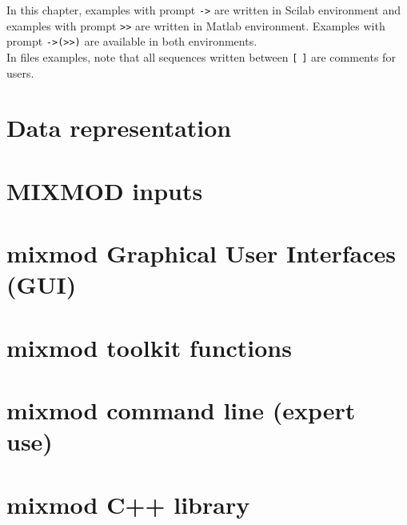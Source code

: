 In this chapter, examples with prompt \verb#-># are written in Scilab environment and examples
with prompt \verb#>># are written in Matlab environment. Examples with prompt \verb#->(>>)#  are available in both environments.\\
In files examples, note that all sequences written between \verb#[#   \verb#]# are comments for users.
\section{Data representation}




 \section{{\sc MIXMOD} inputs}


\section{{\sc mixmod} Graphical User Interfaces (GUI)}



\section{{\sc mixmod} toolkit functions}



\section{{\sc mixmod} command line (expert use)}



\section{{\sc mixmod} C++ library}

